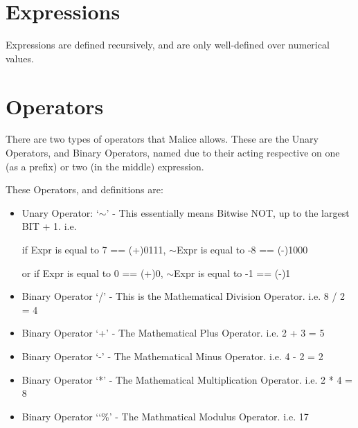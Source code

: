 \documentclass[a4wide, 11pt]{article}
\begin{document}
\section{Expressions}

Expressions are defined recursively, and are only well-defined over numerical values.

\section{Operators}

There are two types of operators that Malice allows. These are the Unary Operators, and Binary Operators, named due to their acting respective on one (as a prefix) or two (in the middle) expression.

These Operators, and definitions are:

\begin{itemize}

\item
Unary Operator: `$\sim$' - This essentially means Bitwise NOT, up to the largest BIT + 1. i.e. 

\vspace{0.75mm} \hspace{25mm} \hspace{12mm} if Expr is equal to 7 == (+)0111, $\sim$Expr is equal to -8 == (-)1000

\vspace{0.75mm} \hspace{25mm} \hspace{12mm} or if Expr is equal to  0 == (+)0, $\sim$Expr is equal to -1 == (-)1
\item
Binary Operator `/' \hspace{2mm}- This is the Mathematical Division Operator. i.e. 8 / 2 = 4
\item
Binary Operator `+' \hspace{1mm}- The Mathematical Plus Operator. i.e. 2 + 3 = 5
\item 
Binary Operator `-'\hspace{3mm} - The Mathematical Minus Operator. i.e. 4 - 2 = 2
\item
Binary Operator `*'\hspace{2.5mm} - The Mathematical Multiplication Operator. i.e. 2 * 4 = 8
\item
Binary Operator `\char`\%'\hspace{1mm} - The Mathmatical Modulus Operator. i.e.  17 %

\end{itemize}
\end{document}
